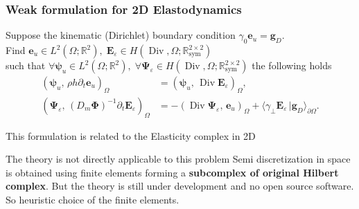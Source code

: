 \documentclass[aspectratio=169]{beamer}
\DeclareMathOperator*{\Div}{Div}
\DeclareMathOperator*{\curl}{curl}
\newcommand{\bbR}{\mathbb{R}}
\newcommand{\bbS}{\mathbb{S}}
\newcommand{\inpr}[3][]{\ensuremath{( #2, \, #3 )_{#1}}}
\newcommand{\dualpr}[3][]{\ensuremath{\langle #2 \, \vert #3 \rangle_{#1}}}
\begin{document}
\begin{frame}[fragile]\frametitle{Weak formulation for 2D Elastodynamics}
		
	\begin{tcolorbox}[nobeforeafter, colframe=theme,title=$\Div$ dual formulation]%
		Suppose the kinematic (Dirichlet) boundary condition $\gamma_0 \bm{e}_u = \bm{g}_D$. \\
		Find $\bm{e}_u \in L^2(\Omega; \bbR^2), \; \bm{E}_{\varepsilon} \in H(\Div, \Omega; \bbR^{2\times 2}_{\text{sym}})$ \\
		such that $\forall \bm{\psi}_u \in L^2(\Omega; \bbR^2), \; \forall \bm{\Psi}_\varepsilon \in H(\Div, \Omega; \bbR^{2\times 2}_{\text{sym}})$ the following holds
		\begin{equation*}
			\begin{aligned}
				\inpr[\Omega]{\bm{\psi}_u}{\rho h \partial_t \bm{e}_u} &= \inpr[\Omega]{\bm{\psi}_u}{\Div\bm{E}_{\varepsilon}}, \\
				\inpr[\Omega]{\bm{\Psi}_\varepsilon}{(D_m \bm{\Phi})^{-1} \partial_t \bm{E}_{\varepsilon}} &= -\inpr[\Omega]{\Div \bm{\Psi}_\varepsilon}{ \bm{e}_u} + \dualpr[\partial\Omega]{\gamma_\perp \bm{E}_\varepsilon}{\bm{g}_D}.
			\end{aligned} 
		\end{equation*}
	\vspace{.5cm}
	
	This formulation is related to the Elasticity complex in 2D 
	\begin{figure}[h]
		\centering
	\end{figure}
	\end{tcolorbox} 

\end{frame}


\begin{frame}{The theory is not directly applicable to this problem}
Semi discretization in space is obtained using finite elements forming a \textbf{subcomplex of original Hilbert complex}. But the theory is still under development and no open source software. \\
\vspace{1cm}
So heuristic choice of the finite elements.
\end{frame}
\end{document}
